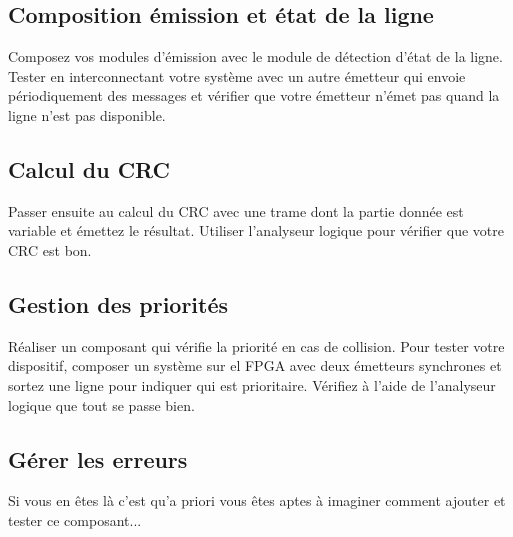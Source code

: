 \documentclass[11pt]{paper}
\begin{document}
\subsection{Composition émission et état de la ligne} Composez vos modules d'émission avec le module de détection d'état de la ligne. Tester en interconnectant votre système avec un autre émetteur qui envoie périodiquement des messages et vérifier que votre émetteur n'émet pas quand la ligne n'est pas disponible.

\subsection{Calcul du CRC} Passer ensuite au calcul du CRC avec une trame dont la partie donnée est variable et émettez le résultat. Utiliser l'analyseur logique pour vérifier que votre CRC est bon.

\subsection{Gestion des priorités} Réaliser un composant qui vérifie la priorité en cas de collision. Pour tester votre dispositif, composer un système sur el FPGA avec deux émetteurs synchrones et sortez une ligne pour indiquer qui est prioritaire. Vérifiez à l'aide de l'analyseur logique que tout se passe bien.

\subsection{Gérer les erreurs} Si vous en êtes là c'est qu'a priori vous êtes aptes à imaginer comment ajouter et tester ce composant...
\end{document}

